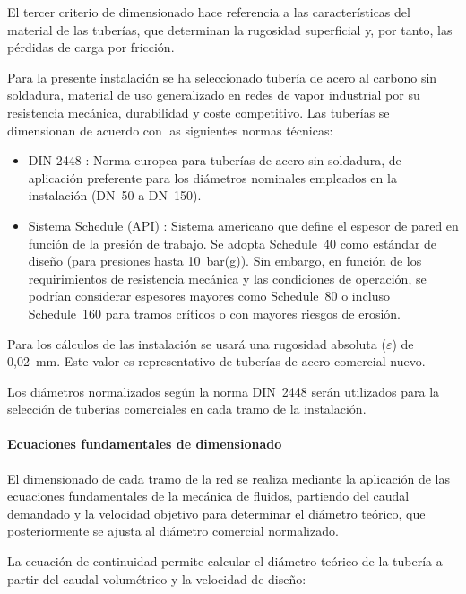 \documentclass[12pt]{article}
\begin{document}
El tercer criterio de dimensionado hace referencia a las características del material de las tuberías, que determinan la rugosidad superficial y, por tanto, las pérdidas de carga por fricción.

Para la presente instalación se ha seleccionado tubería de acero al carbono sin soldadura, material de uso generalizado en redes de vapor industrial por su resistencia mecánica, durabilidad y coste competitivo. Las tuberías se dimensionan de acuerdo con las siguientes normas técnicas:

\begin{itemize}[leftmargin=2em]
	\item DIN 2448 \cite{DIN2448}: Norma europea para tuberías de acero sin soldadura, de aplicación preferente para los diámetros nominales empleados en la instalación (DN~50 a DN~150).
	\item Sistema Schedule (API) \cite{API605}: Sistema americano que define el espesor de pared en función de la presión de trabajo. Se adopta Schedule~40 como estándar de diseño (para presiones hasta 10~bar(g)). Sin embargo, en función de los requirimientos de resistencia mecánica y las condiciones de operación, se podrían considerar espesores mayores como Schedule~80 o incluso Schedule~160 para tramos críticos o con mayores riesgos de erosión.
\end{itemize}

Para los cálculos de las instalación se usará una rugosidad absoluta ($\varepsilon$) de 0,02~mm. Este valor es representativo de tuberías de acero comercial nuevo.

Los diámetros normalizados según la norma DIN~2448 \cite{DIN2448} serán utilizados para la selección de tuberías comerciales en cada tramo de la instalación.

\paragraph{Ecuaciones fundamentales de dimensionado}

El dimensionado de cada tramo de la red se realiza mediante la aplicación de las ecuaciones fundamentales de la mecánica de fluidos, partiendo del caudal demandado y la velocidad objetivo para determinar el diámetro teórico, que posteriormente se ajusta al diámetro comercial normalizado.

La ecuación de continuidad permite calcular el diámetro teórico de la tubería a partir del caudal volumétrico y la velocidad de diseño:
\end{document}

